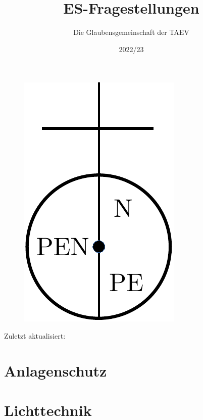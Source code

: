\documentclass[12pt]{article}
\title{\LARGE \textbf{ES-Fragestellungen}}
\date{2022/23}
\author{Die Glaubensgemeinschaft der TAEV}
\begin{document}
    \lhead{}
    \rhead{}

    \begin{titlepage}
        \begin{figure}
            \centering
            \includegraphics{nullung.pdf}
        \end{figure}

        \maketitle 
        \begin{center}
            Zuletzt aktualisiert: \textbf{\filemodprintdate{\jobname}}
        \end{center}
        \clearpage
        \tableofcontents
    \end{titlepage}


    \cfoot{}


    \section{Anlagenschutz}
    
    

    \section{Lichttechnik}
    
    
\end{document}
